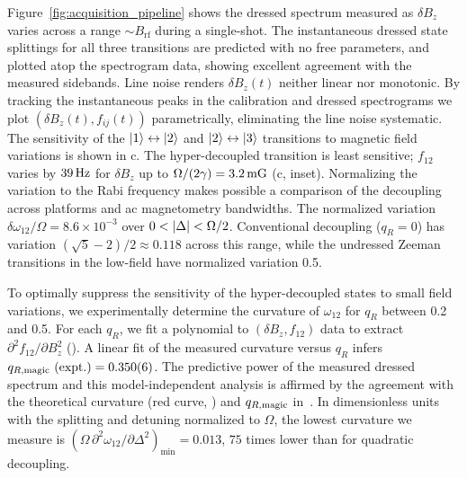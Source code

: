 \documentclass[aps,prl,reprint,superscriptaddress,floatfix]{revtex4-1}
\begin{document}
Figure~\ref{fig:acquisition_pipeline} shows the dressed spectrum measured as $\delta B_z$ varies across a range $\sim B_{\text{rf}}$ during a single-shot.
The instantaneous dressed state splittings for all three transitions are predicted with no free parameters, and plotted atop the spectrogram data, showing excellent agreement with the measured sidebands.
Line noise renders $\delta B_z(t)$ neither linear nor monotonic.
By tracking the instantaneous peaks in the calibration and dressed spectrograms we plot $(\delta B_z(t), f_{ij}(t))$ parametrically, eliminating the line noise systematic.
The sensitivity of the $\vert 1 \rangle  \leftrightarrow \vert 2 \rangle $ and $\vert 2 \rangle  \leftrightarrow \vert 3 \rangle $ transitions to magnetic field variations is shown in c.
The hyper-decoupled transition is least sensitive; $f_{12}$ varies by $\unit[39]{Hz}$ for $\delta B_z$ up to $\Omega/(2\gamma) = \unit[3.2]{mG}$ (c, inset).
Normalizing the variation to the Rabi frequency makes possible a comparison of the decoupling across platforms and ac magnetometry bandwidths. 
The normalized variation $\delta \omega_{12}/\Omega = 8.6\times10^{-3}$ over $0< \vert \Delta \vert  <\Omega/2$.
Conventional decoupling ($q_R=0$) has variation $(\sqrt{5}-2)/2 \approx 0.118$ across this range, while the undressed Zeeman transitions in the low-field have normalized variation 0.5.

To optimally suppress the sensitivity of the hyper-decoupled states to small field variations, we experimentally determine the curvature of $\omega_{12}$  for $q_R$ between 0.2 and 0.5.
For each $q_R$, we fit a polynomial to $(\delta B_z, f_{12})$ data to extract $\partial^2 f_{12}/\partial B_z^2$ ().
A linear fit of the measured curvature versus $q_R$ infers $q_{R,\text{magic}}\text{ (expt.)} = 0.350(6)$.
The predictive power of the measured dressed spectrum and this model-independent analysis is affirmed by the agreement with the theoretical curvature (red curve, ) and $q_{R,\text{magic}}$ in~.
In dimensionless units with the splitting and detuning normalized to $\Omega$, the lowest curvature we measure is $\left(\Omega\, \partial^2\omega_{12}/\partial \Delta^2\right)_{\text{min}} = 0.013$, $75$ times lower than for quadratic decoupling.
\end{document}
